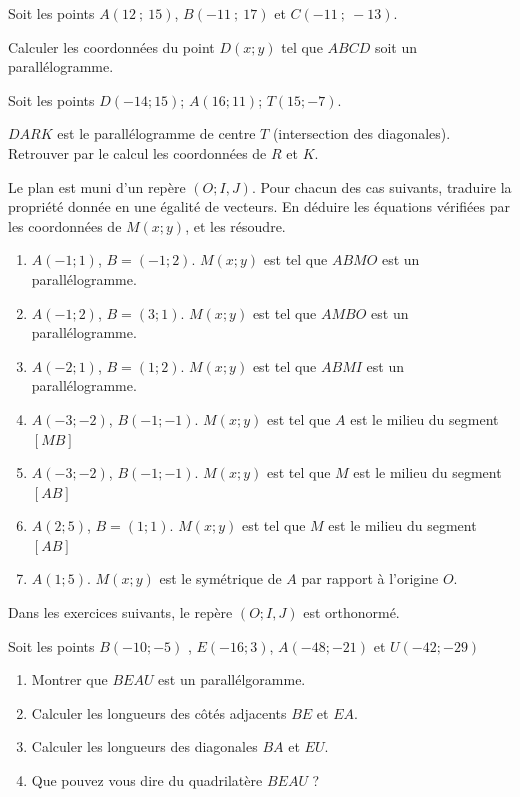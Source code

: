 \documentclass[main.tex]{subfiles}
\begin{document}
\newpage
\begin{exercise} \label{chapter06:exercices:parallelogrammes03}
	Soit les points $A(12~;~15)$, $B(-11~;~17)$ et $C(-11~;~-13)$. 
	
	Calculer les coordonnées du point $D(x;y)$ tel que $ABCD$ soit un parallélogramme.
\end{exercise}  
\begin{exercise}\label{chapter06:exercices:parallelogrammes04} Soit les points   $D(-14;15)$; $A(16;11)$; $T(15;-7)$. 
	
	$DARK$ est le parallélogramme de centre $T$ (intersection des diagonales). Retrouver par le calcul les coordonnées de $R$ et $K$. 
\end{exercise}
\begin{exercise}[Variations]\label{chapter06:exercices:parallelogrammes05} 
	Le plan est muni d'un repère $(O;I,J)$.  Pour chacun des cas suivants, traduire la propriété donnée en une égalité de vecteurs. En déduire les équations vérifiées par les coordonnées de $M(x;y)$, et les résoudre.
	\begin{enumerate}[label=\alph*)]
		\item $A(-1;1)$, $B = ( -1; 2)$. $M(x;y)$ est tel que $ABMO$ est un parallélogramme.
		\item  $A( -1; 2)$, $B = (3; 1)$.  $M(x;y)$ est tel que $AMBO$ est un parallélogramme.
		\item  $A(-2;1)$, $B = (1;2)$.  $M(x;y)$ est tel que $ABMI$ est un parallélogramme.
		\item $A(-3;-2)$, $B(-1;-1)$. $M(x;y)$ est tel que $A$ est le milieu du segment $[MB]$
		\item $A(-3;-2)$, $B(-1;-1)$. $M(x;y)$ est tel que $M$ est le milieu du segment $[AB]$ 
		\item $A(2;5)$, $B = (1; 1)$. $M(x;y)$ est tel que $M$ est le milieu du segment $[AB]$ 
		\item $A(1;5)$. $M(x;y)$ est le symétrique de $A$ par rapport à l'origine $O$.
	\end{enumerate}
\end{exercise}  
\begin{eBox}
	Dans les exercices suivants, le repère $(O;I,J)$ est orthonormé.
\end{eBox} 
\begin{exercise} Soit les points $B(-10;-5)$ , $E(-16;3)$, $A(-48;-21)$ et $U(-42;-29)$
	\begin{enumerate}[label=\alph*), leftmargin=*]\label{chapter06:exercice:naturequadrilatere01}
		\item Montrer que $BEAU$ est un parallélgoramme.
		\item Calculer les longueurs des côtés adjacents $BE$ et $EA$.
		\item Calculer les longueurs des diagonales $BA$ et $EU$. 
		\item Que pouvez vous dire du quadrilatère $BEAU$ ?
	\end{enumerate}
\end{exercise}
\end{document}
